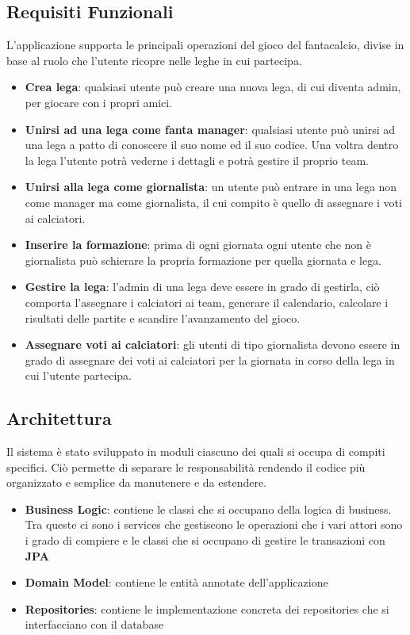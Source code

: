 \subsection{Requisiti Funzionali}
L'applicazione supporta le principali operazioni del gioco del fantacalcio, divise in base al ruolo
che l'utente ricopre nelle leghe in cui partecipa.
\begin{itemize}
    \item \textbf{Crea lega}: qualsiasi utente può creare una nuova lega, di cui diventa admin,
     per giocare con i propri amici.
    \item \textbf{Unirsi ad una lega come fanta manager}: qualsiasi utente può unirsi
    ad una lega a patto di conoscere il suo nome ed il suo codice. Una voltra dentro la
    lega l'utente potrà vederne i dettagli e potrà gestire il proprio team.
    \item \textbf{Unirsi alla lega come giornalista}: un utente può entrare in una lega non come manager
    ma come giornalista, il cui compito è quello di assegnare i voti ai calciatori.
    \item \textbf{Inserire la formazione}: prima di ogni giornata ogni utente che non è
    giornalista può schierare la propria formazione per quella giornata e lega.
    \item \textbf{Gestire la lega}: l'admin di una lega deve essere in grado di gestirla,
    ciò comporta l'assegnare i calciatori ai team, generare il calendario, calcolare i risultati
    delle partite e scandire l'avanzamento del gioco.
    \item \textbf{Assegnare voti ai calciatori}: gli utenti di tipo giornalista devono essere in grado di assegnare
    dei voti ai calciatori per la giornata in corso della lega in cui l'utente partecipa.
\end{itemize}

\subsection{Architettura}
Il sistema è stato sviluppato in moduli ciascuno dei quali si occupa di compiti specifici.
Ciò permette di separare le responsabilità rendendo il codice più organizzato e semplice 
da manutenere e da estendere.
\begin{itemize}
    \item \textbf{Business Logic}: contiene le classi che si occupano della logica di 
    business. Tra queste ci sono i services che gestiscono le operazioni che i vari 
    attori sono i grado di compiere e le classi che si occupano di gestire le transazioni con \textbf{JPA}
    \item \textbf{Domain Model}: contiene le entità annotate dell'applicazione
    \item \textbf{Repositories}: contiene le implementazione concreta dei repositories che si interfacciano con il database
\end{itemize}

